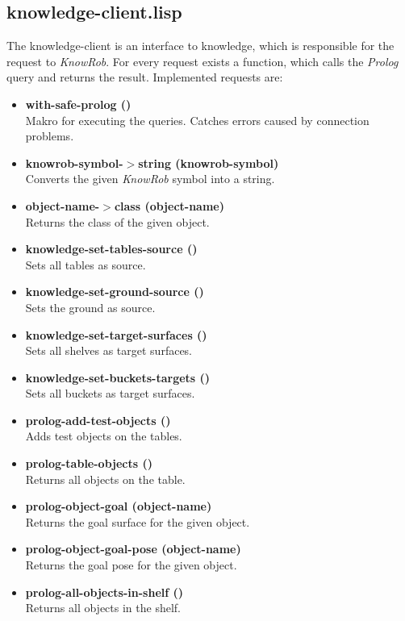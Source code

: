 \documentclass[main.tex]{subfiles}
\begin{document}
		\subsection{knowledge-client.lisp}
		The knowledge-client is an interface to knowledge, which is responsible for the request to \textit{KnowRob}. For every request exists a function, which calls the \textit{Prolog} query and returns the result. Implemented requests are:
			\begin{itemize}
			\label{knowledge-client}
			  \item \textbf{with-safe-prolog ()} \\
			  Makro for executing the queries. Catches errors caused by connection problems.
			  \item \textbf{knowrob-symbol-$>$string (knowrob-symbol)} \\
			  Converts the given \textit{KnowRob} symbol into a string.
			  \item \textbf{object-name-$>$class (object-name)} \\
			  Returns the class of the given object.
				\item \textbf{knowledge-set-tables-source ()} \\ Sets all tables as source.
				\item \textbf{knowledge-set-ground-source ()} \\ Sets the ground as source.
				\item \textbf{knowledge-set-target-surfaces ()} \\ Sets all shelves as target surfaces.
				\item \textbf{knowledge-set-buckets-targets ()} \\ Sets all buckets as target surfaces.
			  \item \textbf{prolog-add-test-objects ()} \\ Adds test objects on the tables.
				\item \textbf{prolog-table-objects ()} \\ Returns all objects on the table.
				\item \textbf{prolog-object-goal (object-name)} \\ Returns the goal surface for the given object.
			  \item \textbf{prolog-object-goal-pose (object-name)} \\ Returns the goal pose for the given object.
				\item \textbf{prolog-all-objects-in-shelf ()} \\ Returns all objects in the shelf.

\end{itemize}
\end{document}
